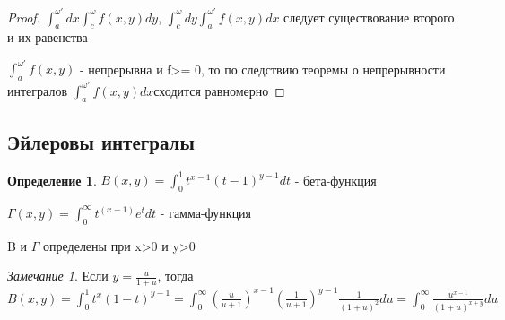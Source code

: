 \documentclass[a4paper, 12pt]{article}
\theoremstyle{definition}
\newtheorem*{definition}{Определение}
\theoremstyle{remark}
\newtheorem*{remark}{Замечание}
\begin{document}
\begin{proof}
     $\int_a^{\omega'} dx \int_c^{\omega}f(x,y)dy$, $\int_c^{\omega}dy \int_a^{\omega'}f(x,y) dx $ следует существование второго и их равенства

$\int_a^{\omega'}f(x,y)$ - непрерывна и f>= 0, \hypertarget{[p5]}{то по следствию теоремы о непрерывности интегралов } $\int_a^{\omega'}f(x,y)dx$сходится равномерно


\end{proof}
\subsection{Эйлеровы интегралы}
\begin{definition}
     $B(x,y) = \int_0^1 t^{x-1}(t-1)^{y - 1}dt$ - бета-функция

     $\Gamma(x,y) = \int_0^{\infty}t^(x-1)e^t dt$ - гамма-функция

     B и $\Gamma$ определены при x>0 и y>0
\end{definition}
\begin{remark}
     Если $y = \frac{u}{1+u}$, тогда
     $B(x,y) = \int_0^1 t^x (1-t)^{y-1} = \int_0^\infty (\frac{u}{u+1})^{x-1}(\frac{1}{u+1})^{y-1} \frac{1}{(1+u)^2}du = \int_0^\infty \frac{u^{x-1}}{(1+u)^{x+y}}du$
\end{remark}
\end{document}

